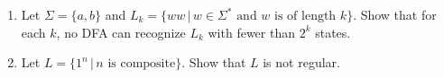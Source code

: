 \documentclass[11pt]{article}
\begin{document}
\begin{enumerate}
\item Let $\Sigma = \{a,b\}$ and $L_k = \{ ww \,|\, w \in \Sigma^* \textrm{ and } w \textrm{ is of length } k \}$. Show that for each $k$, no DFA can recognize $L_k$ with fewer than $2^k$ states.


		
\item Let $L = \{1^n \, | \, n \textrm{ is composite}\}$. Show that $L$ is not regular.



\end{enumerate}
\end{document}
